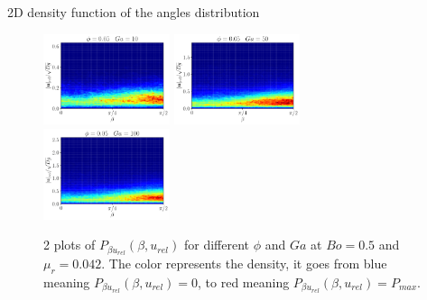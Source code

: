 \documentclass{sintefbeamer}
\begin{document}
\begin{frame}{2D density function of the angles distribution}
  \begin{figure}[h!]
    \centering
    \includegraphics[width = 0.33\textwidth]{image/N_10/beta/2DMAP_beta_v_rel_dmin_10_Bo1PHI0_05mu_r0_42Ga10.pdf}
    \includegraphics[width = 0.33\textwidth]{image/N_10/beta/2DMAP_beta_v_rel_dmin_10_Bo1PHI0_05mu_r0_42Ga50.pdf}
    \includegraphics[width = 0.33\textwidth]{image/N_10/beta/2DMAP_beta_v_rel_dmin_10_Bo1PHI0_05mu_r0_42Ga100.pdf}
    \caption{2 plots of $P_{\beta u_{rel}}(\beta,u_{rel})$ for different $\phi$ and $Ga$ at $Bo = 0.5$ and $\mu_r = 0.042$. The color represents the density, it goes from blue meaning $P_{\beta u_{rel}}(\beta,u_{rel})= 0$, to red meaning $P_{\beta u_{rel}}(\beta,u_{rel}) = P_{max}$.} 
\end{figure} 


\end{frame}
\end{document}
